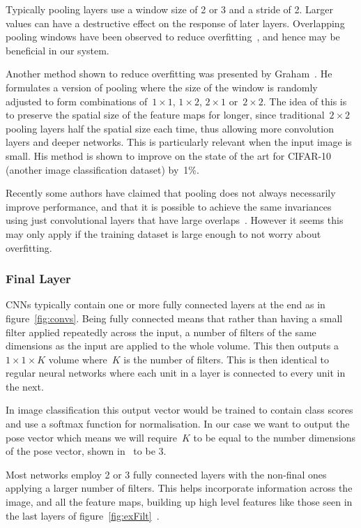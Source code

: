 \documentclass[11pt]{article} %
\begin{document}
Typically pooling layers use a window size of 2 or 3 and a stride of 2. Larger values can have a destructive effect on the response of later layers. Overlapping pooling windows have been observed to reduce overfitting~\cite{Krizhevsky2012}, and hence may be beneficial in our system. 

Another method shown to reduce overfitting was presented by Graham~\cite{Graham2015}. He formulates a version of pooling where the size of the window is randomly adjusted to form combinations of~$1\times 1$, $1\times 2$, $2\times 1$ or~$2\times 2$. The idea of this is to preserve the spatial size of the feature maps for longer, since traditional~$2\times 2$ pooling layers half the spatial size each time, thus allowing more convolution layers and deeper networks. This is particularly relevant when the input image is small. His method is shown to improve on the state of the art for CIFAR-10 (another image classification dataset) by~1\%.

Recently some authors have claimed that pooling does not always necessarily improve performance, and that it is possible to achieve the same invariances using just convolutional layers that have large overlaps~\cite{Springenberg2015}. However it seems this may only apply if the training dataset is large enough to not worry about overfitting. 

\subsubsection{Final Layer}

CNNs typically contain one or more fully connected layers at the end as in figure~\ref{fig:convs}. Being fully connected means that rather than having a small filter applied repeatedly across the input, a number of filters of the same dimensions as the input are applied to the whole volume. This then outputs a~$1\times 1 \times K$ volume where~$K$ is the number of filters. This is then identical to regular neural networks where each unit in a layer is connected to every unit in the next.

In image classification this output vector would be trained to contain class scores and use a softmax function for normalisation. In our case we want to output the pose vector which means we will require~$K$ to be equal to the number dimensions of the pose vector, shown in~\cite{Tao} to be 3. 

Most networks employ 2 or 3 fully connected layers with the non-final ones applying a larger number of filters. This helps incorporate information across the image, and all the feature maps, building up high level features like those seen in the last layers of figure~\ref{fig:exFilt}~\cite{Zeiler2014}. 
\end{document}
